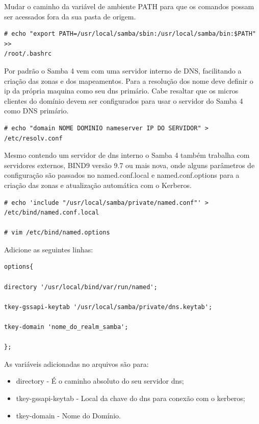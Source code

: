 Mudar o caminho da variável de ambiente PATH para que os comandos possam ser acessados fora da sua pasta de origem.\\

\begin{lstlisting}
# echo "export PATH=/usr/local/samba/sbin:/usr/local/samba/bin:$PATH" >> 
/root/.bashrc
\end{lstlisting}

Por padrão o Samba 4 vem com uma servidor interno de DNS, facilitando a criação das zonas e dos mapeamentos. Para a resolução dos nome deve definir o ip da própria maquina como seu dns primário. Cabe resaltar que os micros clientes do domínio devem ser configurados para usar o servidor do Samba 4 como DNS primário.\\

\begin{lstlisting}
# echo "domain NOME DOMINIO nameserver IP DO SERVIDOR" > /etc/resolv.conf
\end{lstlisting}

Mesmo contendo um servidor de dns interno o Samba 4 também trabalha com servidores externos, BIND9 versão 9.7 ou mais nova, onde alguns parâmetros de configuração são passados no named.conf.local e named.conf.options para a criação das zonas e atualização automática com o Kerberos.\\

\begin{lstlisting}
# echo 'include "/usr/local/samba/private/named.conf"' > 
/etc/bind/named.conf.local

# vim /etc/bind/named.options
\end{lstlisting}

Adicione as seguintes linhas:\\

\begin{lstlisting}
options{ 
	
directory '/usr/local/bind/var/run/named'; 

tkey-gssapi-keytab '/usr/local/samba/private/dns.keytab'; 

tkey-domain 'nome_do_realm_samba';
	
};
\end{lstlisting}

As variáveis adicionadas no arquivos são para:

\begin{itemize}
	\item{directory} -  É o caminho absoluto do seu servidor dns;
	\item{tkey-gssapi-keytab} - Local da chave do dns para conexão com o kerberos;
	\item{tkey-domain} - Nome do Domínio.
\end{itemize}

